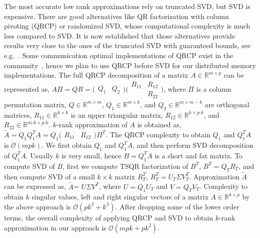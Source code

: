 \documentclass[sigconf]{acmart}
\begin{document}
The most accurate low rank approximations rely on truncated SVD, but SVD is expensive. There are good alternatives like QR factorization with column pivoting (QRCP) or randomized SVD, whose computational complexity is much less compared to SVD. It is now established that those alternatives provide results very close to the ones of the truncated SVD with guaranteed bounds, see e.g.~\cite{demmel19:_improv_analy_and_unified_persp}. Some communication optimal implementations of QRCP exist in the community~\cite{beaupere-tournamentpivoting}, hence we plan to use QRCP before SVD for our distributed memory implementations. The full QRCP decomposition of a matrix $A\in \mathbb{R}^{m\times p}$ can be represented as, $A\Pi = QR = \big(\begin{smallmatrix} Q_1 & Q_2 \end{smallmatrix}\big) \big(\begin{smallmatrix}R_{11} & R_{12}\\ & R_{22} \end{smallmatrix}\big)$, where $\Pi$ is a column permutation matrix, $Q\in \mathbb{R}^{m\times m}$, $Q_1\in \mathbb{R}^{m\times k}$, and $Q_2\in \mathbb{R}^{m\times m-k}$ are orthogonal matrices, $R_{11} \in \mathbb{R}^{k\times k}$ is an upper triangular matrix, $R_{12}\in\mathbb{R}^{k\times p\text{-}k}$, and $R_{22}\in\mathbb{R}^{m\text{-}k\times p\text{-}k}$. $k$-rank approximation of $A$ is obtained as, $\tilde{A} = Q_1Q_1^TA = Q_1 \big(\begin{smallmatrix} R_{11} & R_{12} \end{smallmatrix}\big)\Pi^T$. The QRCP complexity to obtain $Q_1$ and $Q_1^TA$ is $\mathcal{O}(mpk)$. We first obtain $Q_1$ and $Q_1^TA$, and then perform SVD decomposition of $Q_1^TA$. Usually $k$ is very small, hence $B=Q_1^TA$ is a short and fat matrix. To compute SVD of $B$, first we compute TSQR factorization of $B^T$, $B^T = Q_T R_T$, and then compute SVD of a small $k\times k$ matrix $R_T^T$, $R_T^T = U_T\Sigma V^T_T$. Approximation $\tilde{A}$ can be expressed as, $\tilde{A}$= $U\Sigma V^T$, where $U=Q_1U_T$ and $V=Q_TV_T$. Complexity to obtain $k$ singular values, left and right singular vectors of a matrix $A\in\mathbb{R}^{k\times p}$ by the above approach is $\mathcal{O}(pk^2 +k^3)$. After dropping some of the lower order
terms, the overall complexity of applying QRCP and SVD to obtain $k$-rank approximation in our approach is $\mathcal{O}(mpk + pk^2)$.     
\end{document}
